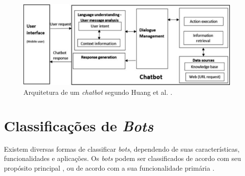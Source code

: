 \begin{figure}[!htb] \centering
\includegraphics[width=12cm]{huang-arquitetura.pdf}
\caption{Arquitetura de um \textit{chatbot} segundo Huang et al. \cite{huang2021}.}
\label{fig:bot-arch}
\end{figure}

\section{Classificações de \textit{Bots}} \label{sec:class-bots}

Existem diversas formas de classificar \textit{bots}, dependendo de suas
características, funcionalidades e aplicações. Os \textit{bots} podem ser
classificados de acordo com seu propósito principal \cite{lebeuf2019}, ou de
acordo com a sua funcionalidade primária \cite{seering2018}.

